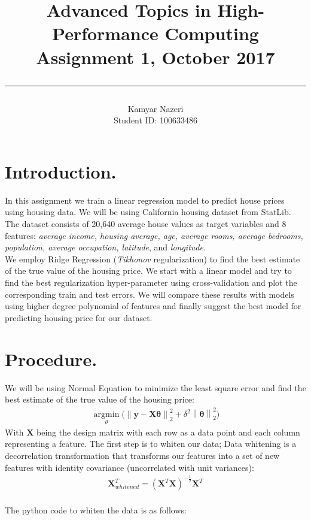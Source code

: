 \documentclass[a4paper,11pt]{article}
\newcommand{\norm}[1]{\left\lVert \mathbf{#1} \right\rVert}
\begin{document}
\title{
	\Huge \textbf {Advanced Topics in High-Performance Computing}
    \\ [0.2cm]
	\LARGE Assignment 1, October 2017
    \\ [0.5cm]
    \hrule
}

\date{}

\author{
		\Large Kamyar Nazeri \\
		\large Student ID: 100633486 }

\maketitle


\newpage

\section{Introduction.}
In this assignment we train a linear regression model to predict house prices using housing data. We will be using California housing dataset from StatLib. The dataset consists of 20,640 average house values as target variables and 8 features: \textit{average income, housing average, age, average rooms, average bedrooms, population, average occupation, latitude}, and \textit{longitude}. \\
We employ Ridge Regression (\textit{Tikhonov} regularization) to find the best estimate of the true value of the housing price. We start with a linear model and try to find the best regularization hyper-parameter using cross-validation and plot the corresponding train and test errors. We will compare these results with models using higher degree polynomial of features and finally suggest the best model for predicting housing price for our dataset.

\section{Procedure.}
We will be using Normal Equation to minimize the least square error and find the best estimate of the true value of the housing price: \\
\begin{align*}
\operatorname*{argmin}_\theta\bigg(\norm{y-X\theta}_2^{2} + \delta^2\norm{\theta}_{2}^2\bigg)
\end{align*}
\noindent
With $\mathbf{X}$ being the design matrix with each row as a data point and each column representing a feature. 
The first step is to whiten our data; Data whitening is a decorrelation transformation that transforms our features into a set of new features with identity covariance (uncorrelated with unit variances): 
\begin{align*}
\mathbf{X}_{whitened}^T = (\mathbf{X}^T\mathbf{X})^{-\frac{1}{2}}\mathbf{X}^T
\end{align*}
\\The python code to whiten the data is as follows:
\end{document}
